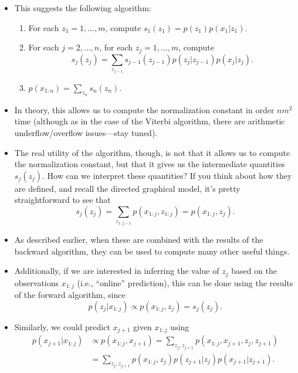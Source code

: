 \documentclass[12pt]{article}
\begin{document}
\begin{itemize}
\item This suggests the following algorithm:
\begin{enumerate}
\item For each $z_1 = 1,\ldots,m$, compute $s_1(z_1) = p(z_1) p(x_1 | z_1)$.
\item For each $j = 2,\ldots,n$, for each $z_j = 1,\ldots,m$, compute
$$ s_j(z_j) = \sum_{z_{j -1}} s_{j -1}(z_{j -1}) p(z_j | z_{j -1}) p(x_j | z_j). $$
\item $p(x_{1:n}) = \sum_{z_n} s_n(z_n)$.
\end{enumerate}
\item In theory, this allows us to compute the normalization constant in order $n m^2$ time (although as in the case of the Viterbi algorithm, there are arithmetic underflow/overflow issues---stay tuned).
\item The real utility of the algorithm, though, is not that it allows us to compute the normalization constant, but that it gives us the intermediate quantities $s_j(z_j)$. How can we interpret these quantities? If you think about how they are defined, and recall the directed graphical model, it's pretty straightforward to see that
$$ s_j(z_j) = \sum_{z_{1:j -1}} p(x_{1:j},z_{1:j}) = p(x_{1:j},z_j). $$
\item As described earlier, when these are combined with the results of the backward algorithm, they can be used to compute many other useful things.
\item Additionally, if we are interested in inferring the value of $z_j$ based on the observations $x_{1:j}$ (i.e., ``online'' prediction), this can be done using the results of the forward algorithm, since
$$ p(z_j | x_{1:j}) \propto p(x_{1:j},z_j) = s_j(z_j). $$
\item Similarly, we could predict $x_{j +1}$ given $x_{1:j}$ using
\begin{align*}
p(x_{j +1} | x_{1:j}) &\propto p(x_{1:j},x_{j +1}) = \sum_{z_j,z_{j +1}} p(x_{1:j},x_{j +1},z_j,z_{j +1})\\
& = \sum_{z_j,z_{j +1}} p(x_{1:j},z_j) p(z_{j +1} | z_j) p(x_{j +1} | z_{j +1}).
\end{align*}
\end{itemize}
\end{document}
